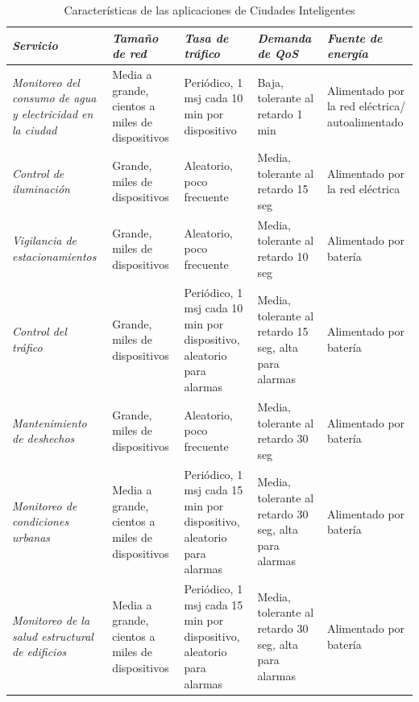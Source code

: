 \begin{table}
\caption{Características de las aplicaciones de Ciudades Inteligentes}
\label{tab:smartcity}
\begin{tabular}{*{5}{m{3cm}}}\\
\textbf{\textit{Servicio}} & \textbf{\textit{Tamaño de red}} & \textbf{\textit{Tasa de tráfico}} & \textbf{\textit{Demanda de QoS}} & \textbf{\textit{Fuente de energía}} \\ \hline
\textit{Monitoreo del consumo de agua y electricidad en la ciudad} & \footnotesize{Media a grande, cientos a miles de dispositivos} & \footnotesize{Periódico, 1 msj cada 10 min por dispositivo} & \footnotesize{Baja, tolerante al retardo 1 min} & \footnotesize{Alimentado por la red eléctrica/ autoalimentado} \\ 
\textit{Control de iluminación} & \footnotesize{Grande, miles de dispositivos} & \footnotesize{Aleatorio, poco frecuente} & \footnotesize{Media, tolerante al retardo 15 seg} & \footnotesize{Alimentado por la red eléctrica }\\ 
\textit{Vigilancia de estacionamientos} & \footnotesize{Grande, miles de dispositivos} & \footnotesize{Aleatorio, poco frecuente} & \footnotesize{Media, tolerante al retardo 10 seg} & \footnotesize{Alimentado por batería }\\ 
\textit{Control del tráfico} & \footnotesize{Grande, miles de dispositivos} & \footnotesize{Periódico, 1 msj cada 10 min por dispositivo, aleatorio para alarmas} & \footnotesize{Media, tolerante al retardo 15 seg, alta para alarmas} & \footnotesize{Alimentado por batería} \\ 
\textit{Mantenimiento de deshechos} & \footnotesize{Grande, miles de dispositivos} & \footnotesize{Aleatorio, poco frecuente} & \footnotesize{Media, tolerante al retardo 30 seg} & \footnotesize{Alimentado por batería }\\ 
\textit{Monitoreo de condiciones urbanas} & \footnotesize{Media a grande, cientos a miles de dispositivos} & \footnotesize{Periódico, 1 msj cada 15 min por dispositivo, aleatorio para alarmas} & \footnotesize{Media, tolerante al retardo 30 seg, alta para alarmas} & \footnotesize{Alimentado por batería }\\ 
\textit{Monitoreo de la salud estructural de edificios} & \footnotesize{Media a grande, cientos a miles de dispositivos} & \footnotesize{Periódico, 1 msj cada 15 min por dispositivo, aleatorio para alarmas} & \footnotesize{Media, tolerante al retardo 30 seg, alta para alarmas} & \footnotesize{Alimentado por batería} \\ 
\end{tabular}
\end{table}

